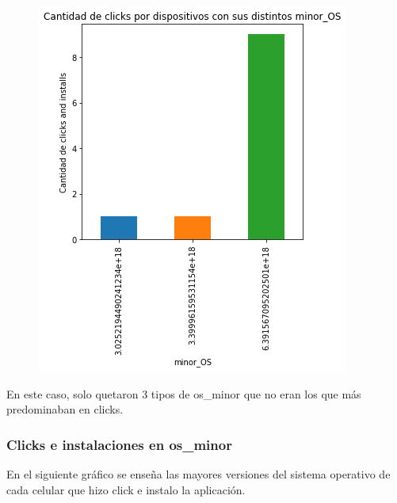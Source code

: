 \documentclass[a4paper, 12pt]{article}
\newcommand\tab[1][1cm]{\hspace*{#1}}
\begin{document}
{{	 \FloatBarrier
		\begin{figure}[h]
			\centering
			\includegraphics[scale = 0.5]{images/clicks-installs/minor_os.png}
			\caption{}
		\end{figure}
	\FloatBarrier
	
	\tab En este caso, solo quetaron 3 tipos de os\_minor que no eran los que más predominaban en clicks.
	
	\subsubsection{Clicks e instalaciones en os\_minor}
	\tab En el siguiente gráfico se enseña las mayores versiones del sistema operativo de cada celular que hizo click e instalo la aplicación.
	
}}
\end{document}
